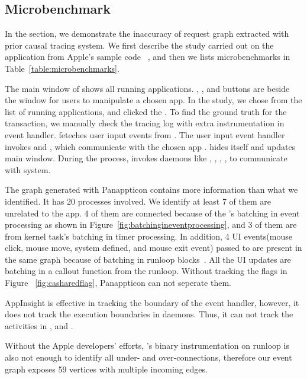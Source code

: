 \subsection{Microbenchmark} \label{sec:toystudy}

In the section, we demonstrate the inaccuracy of request graph extracted with
prior causal tracing system. We first describe the study carried out on the
application from Apple's sample code ~\cite{applist}, and then we
lists microbenchmarks in Table~\ref{table:microbenchmarks}.

The main window of  shows all running applications. ,
, and  buttons are beside the window for users to
manipulate a chosen app.  In the study, we chose  from the list
of running applications, and clicked the . To find the ground truth
for the transaction, we manually check the tracing log with extra
instrumentation in event handler.  feteches user input events from
. The user input event handler invokes  and
, which communicate with the chosen app .
 hides itself and  updates main window. During the
process,  invokes daemons like , ,
, ,  to communicate with system.

The graph generated with Panappticon contains more information than
what we identified. It has 20 processes involved. We identify at least
7 of them are unrelated to the app. 4 of them are connected because
of the 's batching in event processing as shown in
Figure~\ref{fig:batchingineventprocessing}, and 3 of them are from kernel task's
batching in timer processing. In addition, 4 UI events(mouse click, mouse move,
system defined, and mouse exit event) passed to  are present in the
same graph because of batching in runloop blocks~\cite{runloop}. All the UI
updates are batching in a callout function from the runloop. Without tracking
the flags in Figure ~\ref{fig:casharedflag}, Panappticon can not seperate them.

AppInsight is effective in tracking the boundary of the event handler, however,
it does not track the execution boundaries in daemons. Thus, it can not track
the activities in ,  and .

Without the Apple developers' efforts, \xxx's binary instrumentation on runloop
is also not enough to identify all under- and over-connections, therefore our
event graph exposes 59 vertices with multiple incoming edges.

